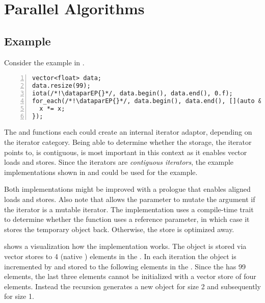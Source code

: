 \section{Parallel Algorithms}

\subsection{Example}
Consider the example in .
\begin{lstlisting}[style=Vc,numbers=left,float,label=lst:datapar foreach,caption={
  Example using \dataparEP with \code{iota} and \code{for_each}.
}]
vector<float> data;
data.resize(99);
iota(/*!\dataparEP{}*/, data.begin(), data.end(), 0.f);
for_each(/*!\dataparEP{}*/, data.begin(), data.end(), [](auto &x) {
  x *= x;
});
\end{lstlisting}
The  and  functions each could create an internal \datapar iterator adaptor, depending on the iterator category.
Being able to determine whether the storage, the iterator points to, is contiguous, is most important in this context as it enables vector loads and stores.
Since the \std{} iterators are \emph{contiguous iterators}, the example implementations shown in  and  could be used for the example.



Both implementations might be improved with a prologue that enables aligned loads and stores.
Also note that  allows the  parameter to mutate the argument if the iterator is a mutable iterator.
The implementation uses a compile-time trait to determine whether the function  uses a reference parameter, in which case it stores the temporary \datapar object back.
Otherwise, the store is optimized away.

 shows a visualization how the  implementation works.
The  \datapar object is stored via vector stores to 4 (native \datapar[::size()]) elements in the \std{}.
In each iteration the  object is incremented by \datapar[::size()] and stored to the following elements in the \std{}.
Since the \std{} has 99 elements, the last three elements cannot be initialized with a vector store of four elements.
Instead the  recursion generates a new  \datapar object for size 2 and subsequently for size 1.

